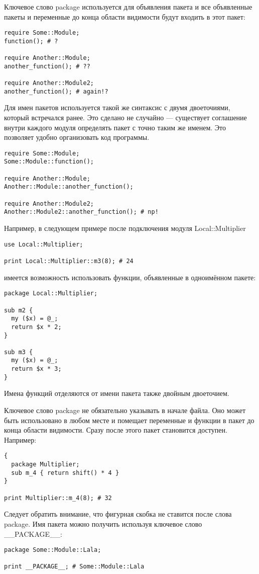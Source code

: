 Ключевое слово package используется для объявления пакета и все объявленные пакеты и переменные до конца области видимости будут входить в этот пакет:
\begin{verbatim}
require Some::Module;
function(); # ?

require Another::Module;
another_function(); # ??

require Another::Module2;
another_function(); # again!?
\end{verbatim}
Для имен пакетов используется такой же синтаксис с двумя двоеточиями, который встречался ранее. Это сделано не случайно --- существует соглашение внутри каждого модуля определять пакет с точно таким же именем. Это позволяет удобно организовать код программы.
\begin{verbatim}
require Some::Module;
Some::Module::function();

require Another::Module;
Another::Module::another_function();

require Another::Module2;
Another::Module2::another_function(); # np!
\end{verbatim}

Например, в следующем примере после подключения модуля Local::Multiplier
\begin{verbatim}
use Local::Multiplier;

print Local::Multiplier::m3(8); # 24
\end{verbatim}
имеется возможность использовать функции, объявленные в одноимённом пакете:
\begin{verbatim}
package Local::Multiplier;

sub m2 {
  my ($x) = @_;
  return $x * 2;
}

sub m3 {
  my ($x) = @_;
  return $x * 3;
}
\end{verbatim}
Имена функций отделяются от имени пакета также двойным двоеточием.

Ключевое слово package не обязательно указывать в начале файла. Оно может быть использовано в любом месте и помещает переменные и функции в пакет до конца области видимости. Сразу после этого пакет становится доступен. Например:
\begin{verbatim}
{
  package Multiplier;
  sub m_4 { return shift() * 4 }
}

print Multiplier::m_4(8); # 32
\end{verbatim}
Следует обратить внимание, что фигурная скобка не ставится после слова package. Имя пакета можно получить используя ключевое слово \_\_PACKAGE\_\_:
\begin{verbatim}
package Some::Module::Lala;

print __PACKAGE__; # Some::Module::Lala
\end{verbatim}

